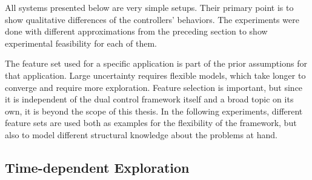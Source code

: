 All systems presented below are very simple setups. Their primary point is to
show qualitative differences of the controllers' behaviors. The experiments
were done with different approximations from the preceding section to show
experimental feasibility for each of them.

The feature set used for a specific application is part of the prior
assumptions for that application. Large uncertainty requires flexible models,
which take longer to converge and require more exploration. Feature
selection is important, but since it is independent of the dual
control framework itself and a broad topic on its own, it is beyond the scope
of this thesis. In the following experiments, different feature sets are used
both as examples for the flexibility of the framework, but also to model
different structural knowledge about the problems at hand.

\subsection{Time-dependent Exploration}
\label{sec:exp-pendulum}

